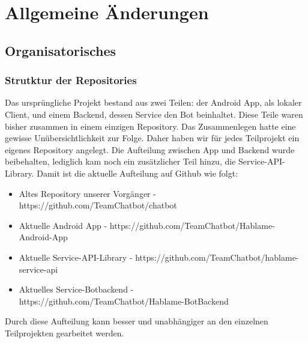 \section{Allgemeine Änderungen}

\subsection{Organisatorisches}
\subsubsection{Strutktur der Repositories}
Das ursprüngliche Projekt bestand aus zwei Teilen: der Android App, als lokaler Client, und einem Backend, dessen Service den Bot beinhaltet. Diese Teile waren bisher zusammen in einem einzigen Repository. Das Zusammenlegen hatte eine gewisse Unübersichtlichkeit zur Folge. Daher haben wir für jedes Teilprojekt ein eigenes Repository angelegt. Die Aufteilung zwischen App und Backend wurde beibehalten, lediglich kam noch ein zusätzlicher Teil hinzu, die Service-API-Library. Damit ist die aktuelle Aufteilung auf Github wie folgt:
\begin{itemize}\itemsep0pt
	\item Altes Repository unserer Vorgänger - https://github.com/TeamChatbot/chatbot
	\item Aktuelle Android App - https://github.com/TeamChatbot/Hablame-Android-App
	\item Aktuelle Service-API-Library - https://github.com/TeamChatbot/hablame-service-api
	\item Aktuelles Service-Botbackend - \\https://github.com/TeamChatbot/Hablame-BotBackend
\end{itemize}
Durch diese Aufteilung kann besser und unabhängiger an den einzelnen Teilprojekten gearbeitet werden.

